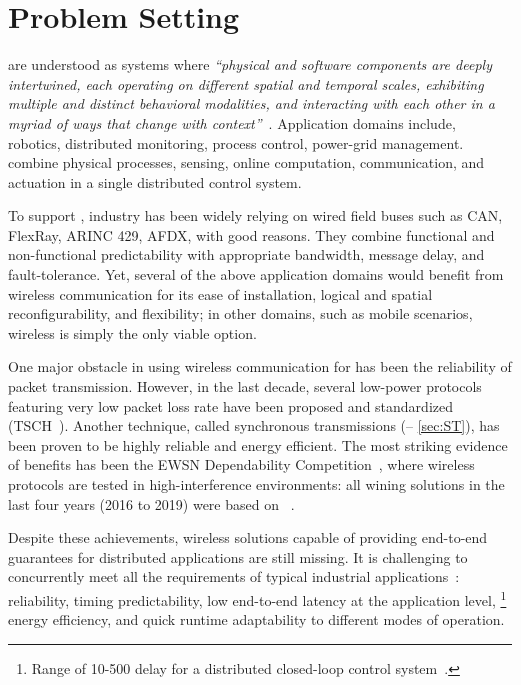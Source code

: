 
\section{Problem Setting}
\label{sec:ttw_intro}


\cps are understood as systems where \emph{``physical and software components are deeply intertwined, each operating on different spatial and temporal scales, exhibiting multiple and distinct behavioral modalities, and interacting with each other in a myriad of ways that change with context''}~\cite{nsf2010Cyber}.
Application domains include, \eg robotics, distributed monitoring, process control, power-grid management.
\cps combine physical processes, sensing, online computation, communication, and actuation in a single distributed control system.

To support \cps, industry has been widely relying on wired field buses such as CAN, FlexRay, ARINC 429, AFDX, with good reasons. They combine functional and non-functional predictability with appropriate bandwidth, message delay, and fault-tolerance.
Yet, several of the above application domains would benefit from wireless communication for its ease of installation, logical and spatial reconfigurability, and flexibility; in other domains, such as mobile scenarios, wireless is simply the only viable option.

One major obstacle in using wireless communication for \CPS has been the reliability of packet transmission.
However, in the last decade, several low-power protocols featuring very low packet loss rate have been proposed and standardized (\eg TSCH~\cite{watteyne2017Teaching}).
Another technique, called synchronous transmissions (\ST -- \cref{sec:ST}), has been proven to be highly reliable and energy efficient.
The most striking evidence of \ST benefits has been the EWSN Dependability Competition~\cite{schuss2017Competition}, where wireless protocols are tested in high-interference environments: all wining solutions in the last four years (2016 to 2019) were based on \ST~\cite{escobar2018Competition,sommer2016Competition,lim2017Competition, escobar2019RedNodeBus, ma2019DeCoT}.

Despite these achievements, wireless \CPS solutions capable of providing end-to-end guarantees for distributed applications are still missing.
It is challenging to concurrently meet all the requirements of typical industrial applications~\cite{akerberg2011Future}: reliability, timing predictability, low end-to-end latency at the application level,%
%
\footnote{Range of 10-500 \ms delay for a distributed closed-loop control system~\cite{akerberg2011Future}.}
%
energy efficiency, and quick runtime adaptability to different modes of operation.

